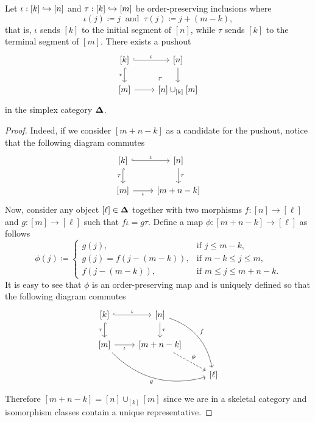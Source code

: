 \begin{lemma}
\label{lem:splx-cat-pushout-injections}
Let \(\iota: [k] \hookrightarrow [n]\) and \(\tau: [k] \hookrightarrow [m]\) be order-preserving
inclusions where
\[
\iota(j) \coloneq j\ \text{ and }\ \tau(j) \coloneq j + (m - k),
\]
that is, \(\iota\) sends \([k]\) to the initial segment of \([n]\), while
\(\tau\) sends \([k]\) to the terminal segment of \([m]\). There exists a
pushout
\[
\begin{tikzcd}
{[k]} \ar[r, hook, "\iota"] \ar[d, hook, "\tau"']
\ar[rd, "\ulcorner", very near end, phantom]
&{[n]} \ar[d] \\
{[m]} \ar[r] &{[n] \cup_{[k]} [m]}
\end{tikzcd}
\]
in the simplex category \({\mathbf{\Delta}}\).
\end{lemma}

\begin{proof}
Indeed, if we consider \([m + n - k]\) as a candidate for the pushout, notice
that the following diagram commutes
\[
\begin{tikzcd}
{[k]} \ar[r, hook, "\iota"] \ar[d, hook, "\tau"']
&{[n]} \ar[d, "\tau"] \\
{[m]} \ar[r, "\iota"'] &{[m + n - k]}
\end{tikzcd}
\]
Now, consider any object \([\ell] \in {\mathbf{\Delta}}\) together with two morphisms
\(f: [n] \to [\ell]\) and \(g: [m] \to [\ell]\) such that \(f \iota = g
\tau\). Define a map \(\phi: [m + n - k] \to [\ell]\) as follows
\[
\phi(j) \coloneq
\begin{cases}
  g(j),                  &\text{if } j \leq m - k, \\
  g(j) = f(j - (m - k)), &\text{if } m - k \leq j \leq m, \\
  f(j - (m - k)),        &\text{if } m \leq j \leq m + n - k.
\end{cases}
\]
It is easy to see that \(\phi\) is an order-preserving map and is uniquely
defined so that the following diagram commutes
\[
\begin{tikzcd}
{[k]} \ar[r, hook, "\iota"] \ar[d, hook, "\tau"']
&{[n]} \ar[d, "\tau"] \ar[drd, bend left, "f"] & \\
{[m]} \ar[r, "\iota"'] \ar[rrd, bend right, "g"']
&{[m + n - k]} \ar[rd, dashed, "\phi"] & \\
& &{[\ell]}
\end{tikzcd}
\]
Therefore \([m + n - k] = [n] \cup_{[k]} [m]\) since we are in a skeletal
category and isomorphism classes contain a unique representative.
\end{proof}

